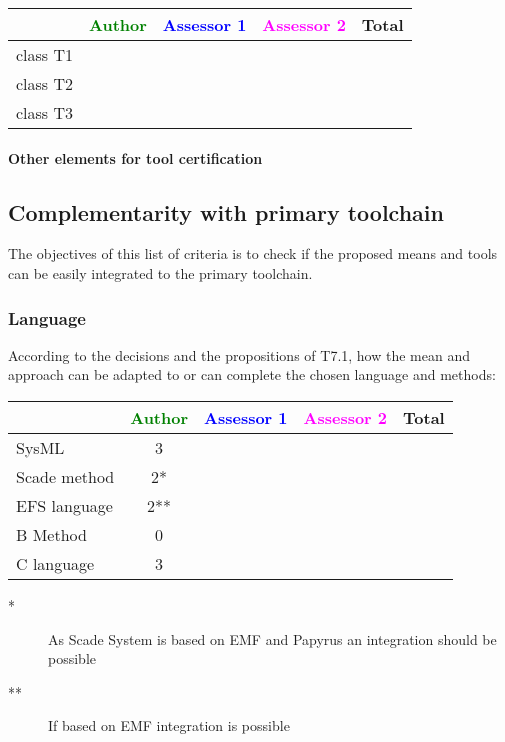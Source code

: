 \begin{tabular}{|l | c | c | c | c|}
\hline
& \textcolor{green}{Author} & \textcolor{blue}{Assessor 1} & \textcolor{magenta}{Assessor 2} & Total \\
\hline 
class T1 & & & &  \\
\hline
class T2   & & & & \\
\hline
class T3  & & & & \\
\hline
\end{tabular}

\paragraph{Other elements for tool certification}


\subsection{Complementarity with primary toolchain}

The objectives of this list of criteria is to check if the proposed means and tools can be easily integrated to the primary toolchain.

\subsubsection{Language}


According to the decisions and the propositions of T7.1, how the mean and approach can be adapted to or can complete the chosen language and methods:

\begin{tabular}{|l | c | c | c | c|}
\hline
& \textcolor{green}{Author} & \textcolor{blue}{Assessor 1} & \textcolor{magenta}{Assessor 2} & Total \\
\hline 
SysML  & 3& & & \\
\hline
Scade method & 2*& & & \\
\hline
EFS language & 2**& & & \\
\hline
B Method & 0& & & \\
\hline
C language & 3& & & \\
\hline
\end{tabular}

\begin{author_comment}
\begin{description}
\item[*] As Scade System is based on EMF and Papyrus an integration should be possible
\item[**] If based on EMF integration is possible
\end{description}
\end{author_comment}


